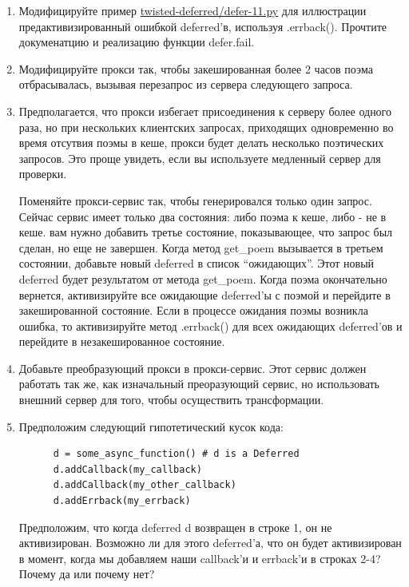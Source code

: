 \begin{enumerate}

\item Модифицируйте пример 
\href{http://github.com/jdavisp3/twisted-intro/blob/master/twisted-deferred/defer-11.py#L1}{twisted-deferred/defer-11.py} для иллюстрации предактивизированный ошибкой deferred'в, 
используя .errback(). Прочтите докуменатцию и реализацию функции defer.fail.

\item Модифицируйте прокси так, чтобы закешированная более 2 часов поэма отбрасывалась, 
вызывая перезапрос из сервера следующего запроса.

\item Предполагается, что прокси избегает присоединения к серверу более 
одного раза, но при нескольких клиентских запросах, приходящих 
одновременно во время отсутвия поэмы в кеше, прокси будет делать 
несколько поэтических запросов. Это проще увидеть, если вы используете 
медленный сервер для проверки. 

Поменяйте прокси-сервис так, 
чтобы генерировался только один запрос. Сейчас 
сервис имеет только два состояния: либо поэма к кеше, либо - не в кеше. 
вам нужно добавить третье состояние, показывающее, что запрос был сделан, 
но еще не завершен. Когда метод get\_poem вызывается в третьем состоянии, 
добавьте новый deferred в список ``ожидающих''. Этот новый deferred 
будет результатом от метода get\_poem. Когда поэма окончательно 
вернется, активизируйте все ожидающие deferred'ы с поэмой и 
перейдите в закешированной состояние. Если в процессе ожидания поэмы 
возникла ошибка, то активизируйте метод .errback() для 
всех ожидающих deferred'ов и перейдите в незакешированное состояние.  

\item Добавьте преобразующий прокси в прокси-сервис. Этот сервис должен 
работать так же, как изначальный преоразующий сервис, но использовать 
внешний сервер для того, чтобы осуществить трансформации. 

\item Предположим следующий гипотетический кусок кода:

\begin{scriptsize}\begin{verbatim}
      d = some_async_function() # d is a Deferred
      d.addCallback(my_callback)
      d.addCallback(my_other_callback)
      d.addErrback(my_errback)
\end{verbatim}\end{scriptsize}

Предположим, что когда deferred d возвращен в строке 1, 
он не активизирован. Возможно ли для этого deferred'а, что 
он будет активизирован в момент, когда мы добавляем наши 
callback'и и errback'и в строках 2-4? Почему да или почему нет?

\end{enumerate}

